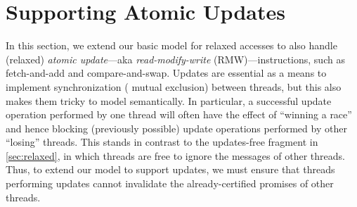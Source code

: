 \newcommand{\figupdates}{
\begin{figure}[t]
\small
\begin{mathpar}
%
\vspace*{-1mm}
%
\inferrule[\textsc{(thread: fulfill update)}]
{
\sigma \astep{\ulab(x,v_\lr,v_\lw)} \sigma'  \\
\updmsg{x}{v_\lr}{f_\lr}{t_\lr} \in \mem \\\\
m_\lw=\updmsg{x}{v_\lw}{t_\lr}{t_\lw} \\ m_\lw \in \lprom \\ \lprom'=\lprom \setminus \setofz{m_\lw}\\\\
\rlxcur(x) \leq t_\lr \\
\rlxcur'  = \rlxcur[x\mapsto t_\lw]
}
{\tup{\tup{\sigma, \rlxcur, \lprom}, \mem} \astep{} \tup{\tup{\sigma', \rlxcur', \lprom'}, \mem}}
\end{mathpar}
\caption{Additional rule for updates (all other rules are as before except all
messages $\rlxmsg{x}{v}{t}$ are replaced by $\updmsg{x}{v}{f}{t}$).}
\label{fig:updates}
\end{figure}}


\section{Supporting Atomic Updates}
\label{sec:updates}

In this section, we extend our basic model for relaxed accesses to
also handle (relaxed) \emph{atomic update}---aka \emph{read-modify-write}
(RMW)---instructions, such as fetch-and-add and compare-and-swap.
Updates are essential as a means to implement synchronization (\eg
mutual exclusion) between threads, but this also makes them tricky to
model semantically.  In particular, a successful update operation
performed by one thread will often have the effect of ``winning a
race'' and hence blocking (previously possible) update operations
performed by other ``losing'' threads.  This stands in contrast to the
updates-free fragment in \cref{sec:relaxed}, in which threads are free
to ignore the messages of other threads.  Thus, to extend our model to
support updates, we must ensure that threads performing
updates cannot invalidate the already-certified promises of other
threads.


